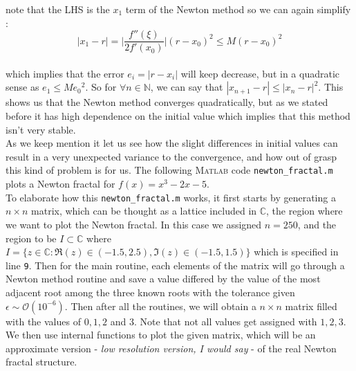 \documentclass[paper=a4, fontsize=11pt]{scrartcl}
\newcommand{\MATLAB}{\textsc{Matlab}\xspace}
\begin{document}
note that the LHS is the $x_1$ term of the Newton method so we can again simplify : \\

\begin{equation}\nonumber
		| x_1 - r | = \Bigg| \frac{f''(\xi)}{2f'(x_0)} \Bigg|  (r-x_0)^2 \leq M (r-x_0)^2
\end{equation}\\

which implies that the error $e_i=|r-x_i|$ will keep decrease, but in a quadratic sense as $e_1 \leq M {e_0}^2$. So for $\forall n \in \mathbb{N}$, we can say that $|x_{n+1}-r|\leq|x_n - r|^2$. This shows us that the Newton method converges quadratically, but as we stated before it has high dependence on the initial value which implies that this method isn't very stable.  \\

As we keep mention it let us see how the slight differences in initial values can result in a very unexpected variance to the convergence, and how out of grasp this kind of problem is for us. The following \MATLAB code \texttt{newton\_fractal.m} plots a Newton fractal for $f(x)=x^3-2x-5$. \\

To elaborate how this \texttt{newton\_fractal.m} works, it first starts by generating a $n \times n$ matrix, which can be thought as a lattice included in $\mathbb{C}$, the region where we want to plot the Newton fractal. In this case we assigned $n=250$, and the region to be $I\subset \mathbb{C}$ where $I=\{z\in\mathbb{C} : \Re(z)\in(-1.5,2.5) , \Im(z) \in (-1.5,1.5) \}$ which is specified in line \texttt{9}. Then for the main routine, each elements of the matrix will go through a Newton method routine and save a value differed by the value of the most adjacent root among the three known roots with the tolerance given $\epsilon \sim \mathcal{O}(10^{-6})$. Then after all the routines, we will obtain a $n \times n$ matrix filled with the values of $0,1,2$ and $3$. Note that not all values get assigned with $1,2,3$. We then use internal functions to plot the given matrix, which will be an approximate version -\textit{ low resolution version, I would say }- of the real Newton fractal structure. \\
\end{document}
